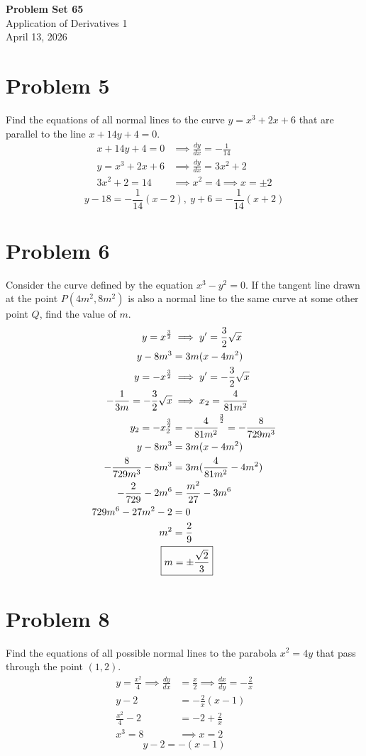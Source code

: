 \documentclass[12pt]{article}
\newcommand{\dydx}{\frac{dy}{dx}}
\newcommand{\problem}[1]{\section{Problem #1}}
\begin{document}
\vspace*{0cm}

\begin{center}
    {\Large \bfseries Problem Set 65} \\[0.5cm]
    {\large Application of Derivatives 1} \\[0.35cm]
    {\normalsize April 13, 2026}
\end{center}


\problem{5}
Find the equations of all normal lines to the curve $y=x^3+2x+6$ that are parallel to the line $x+14y+4=0$.
\begin{align*}
    x+14y+4=0 & \implies \dydx =-\frac{1}{14}\\
    y=x^3+2x+6 & \implies \dydx = 3x^2+2\\
    3x^2+2=14 &\implies x^2=4 \implies x=\pm 2
\end{align*}
\[
\boxed{y-18=-\frac{1}{14}(x-2), \ y+6=-\frac{1}{14}(x+2)}
\]

\problem{6}
Consider the curve defined by the equation $x^3-y^2=0$. If the tangent line drawn at the point $P(4m^2,8m^2)$ is also a normal line to the same curve at some other point $Q$, find the value of $m$.
\begin{align*}
    y=x^\frac{3}{2} & \implies y'=\frac{3}{2}\sqrt{x}\\
    y-8m^3&=3m(x-4m^2)\\
    y=-x^\frac{3}{2} & \implies y'=-\frac{3}{2}\sqrt{x}\\
    -\frac{1}{3m}=-\frac{3}{2}\sqrt{x} &\implies x_2=\frac{4}{81m^2}\\
    y_2=-x_2^{\frac{3}{2}} &= -\frac{4}{81m^2}^{\frac{3}{2}} = - \frac{8}{729m^3} \\
    y-8m^3&=3m(x-4m^2)\\
    - \frac{8}{729m^3}-8m^3&=3m(\frac{4}{81m^2}-4m^2)\\
    - \frac{2}{729}-2m^6&=\frac{m^2}{27}-3m^6\\
    729m^6-27m^2-2&=0\\
    m^2 &= \frac{2}{9}\\
    & \hspace{-1.15em} \boxed{m=\pm \frac{\sqrt{2}}{3}}
\end{align*}

\problem{8}
Find the equations of all possible normal lines to the parabola $x^2=4y$ that pass through the point $(1,2)$.
\begin{align*}
    y=\frac{x^2}{4} \implies \dydx &=\frac{x}{2} \implies \frac{dx}{dy} = -\frac{2}{x}\\
    y-2&=-\frac{2}{x}(x-1) \\
    \frac{x^2}{4}-2&=-2+\frac{2}{x}\\
    x^3=8 & \implies x=2
\end{align*}
\[
\boxed{y-2=-(x-1)}
\]
\end{document}
